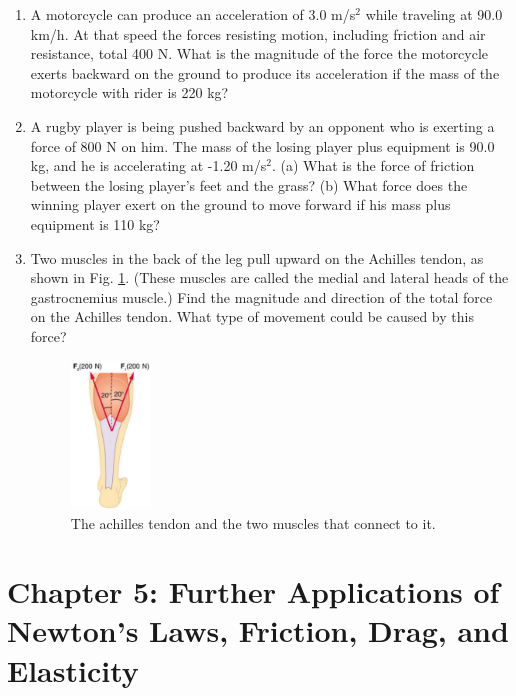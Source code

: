 \documentclass[10pt]{article}
\begin{document}
\begin{enumerate}
\item A motorcycle can produce an acceleration of 3.0 m/s$^2$ while traveling at 90.0 km/h. At that speed the forces resisting motion, including friction and air resistance, total 400 N.  What is the magnitude of the force the motorcycle exerts backward on the ground to produce its acceleration if the mass of the motorcycle with rider is 220 kg? \\ \vspace{2.5cm}
\item A rugby player is being pushed backward by an opponent who is exerting a force of 800 N on him.  The mass of the losing player plus equipment is 90.0 kg, and he is accelerating at -1.20 m/s$^2$.  (a) What is the force of friction between the losing player’s feet and the grass? (b) What force does the winning player exert on the ground to move forward if his mass plus equipment is 110 kg? \\ \vspace{2.5cm}
\item Two muscles in the back of the leg pull upward on the Achilles tendon, as shown in Fig. \ref{fig:muscle}. (These muscles are called the medial and lateral heads of the gastrocnemius muscle.) Find the magnitude and direction of the total force on the Achilles tendon.  What type of movement could be caused by this force? \\ \vspace{2.5cm}
\begin{figure}[hb]
\centering
\includegraphics[width=0.2\textwidth]{figures/muscle.png}
\caption{\label{fig:muscle} The achilles tendon and the two muscles that connect to it.}
\end{figure}
\end{enumerate}

\clearpage

\section{Chapter 5: Further Applications of Newton's Laws, Friction, Drag, and Elasticity}
\end{document}
